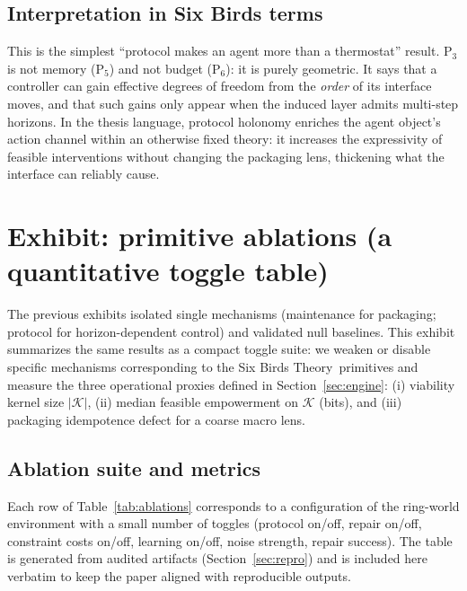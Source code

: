 \documentclass[11pt]{article}
\newcommand{\SBT}{Six Birds Theory}
\newcommand{\K}{\mathcal{K}}
\begin{document}
\subsection{Interpretation in Six Birds terms}
This is the simplest ``protocol makes an agent more than a thermostat'' result. P$_3$ is not memory (P$_5$) and not budget (P$_6$): it is purely geometric. It says that a controller can gain effective degrees of freedom from the \emph{order} of its interface moves, and that such gains only appear when the induced layer admits multi-step horizons. In the thesis language, protocol holonomy enriches the agent object's action channel within an otherwise fixed theory: it increases the expressivity of feasible interventions without changing the packaging lens, thickening what the interface can reliably cause.
 \section{Exhibit: primitive ablations (a quantitative toggle table)}
\label{sec:ex_ablations}

The previous exhibits isolated single mechanisms (maintenance for packaging; protocol for horizon-dependent control) and validated null baselines. This exhibit summarizes the same results as a compact toggle suite: we weaken or disable specific mechanisms corresponding to the \SBT\ primitives and measure the three operational proxies defined in Section~\ref{sec:engine}:
(i) viability kernel size $|\K|$,
(ii) median feasible empowerment on $\K$ (bits), and
(iii) packaging idempotence defect for a coarse macro lens.

\subsection{Ablation suite and metrics}
Each row of Table~\ref{tab:ablations} corresponds to a configuration of the ring-world environment with a small number of toggles (protocol on/off, repair on/off, constraint costs on/off, learning on/off, noise strength, repair success). The table is generated from audited artifacts (Section~\ref{sec:repro}) and is included here verbatim to keep the paper aligned with reproducible outputs.
\end{document}
